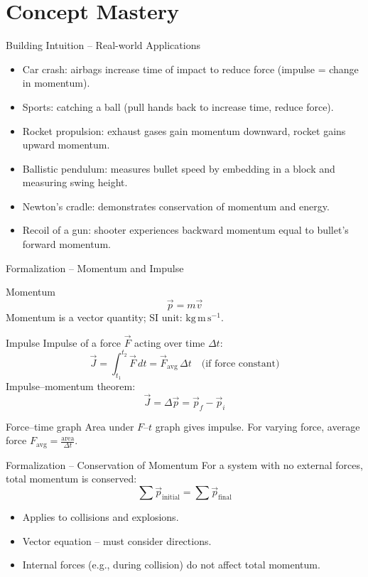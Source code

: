 \documentclass[11pt]{beamer}
\begin{document}
\section{Concept Mastery}

\begin{frame}{Building Intuition – Real-world Applications}
\begin{itemize}
    \item \alert{Car crash}: airbags increase time of impact to reduce force (impulse = change in momentum).
    \item \alert{Sports}: catching a ball (pull hands back to increase time, reduce force).
    \item \alert{Rocket propulsion}: exhaust gases gain momentum downward, rocket gains upward momentum.
    \item \alert{Ballistic pendulum}: measures bullet speed by embedding in a block and measuring swing height.
    \item \alert{Newton's cradle}: demonstrates conservation of momentum and energy.
    \item \alert{Recoil of a gun}: shooter experiences backward momentum equal to bullet's forward momentum.
\end{itemize}
\end{frame}

\begin{frame}[shrink=15]{Formalization – Momentum and Impulse}
\begin{block}{Momentum}
\[ \vec{p} = m\vec{v} \]
Momentum is a vector quantity; SI unit: $\mathrm{kg\,m\,s^{-1}}$.
\end{block}
\begin{block}{Impulse}
Impulse of a force $\vec{F}$ acting over time $\Delta t$:
\[ \vec{J} = \int_{t_1}^{t_2} \vec{F}\,dt = \vec{F}_{\text{avg}}\,\Delta t \quad\text{(if force constant)} \]
Impulse–momentum theorem:
\[ \vec{J} = \Delta\vec{p} = \vec{p}_f - \vec{p}_i \]
\end{block}
\begin{block}{Force–time graph}
Area under $F$–$t$ graph gives impulse. For varying force, average force $F_{\text{avg}} = \frac{\text{area}}{\Delta t}$.
\end{block}
\end{frame}

\begin{frame}{Formalization – Conservation of Momentum}
For a system with no external forces, total momentum is conserved:
\[ \sum \vec{p}_{\text{initial}} = \sum \vec{p}_{\text{final}} \]
\begin{itemize}
    \item Applies to collisions and explosions.
    \item Vector equation – must consider directions.
    \item Internal forces (e.g., during collision) do not affect total momentum.
\end{itemize}
\end{frame}
\end{document}
